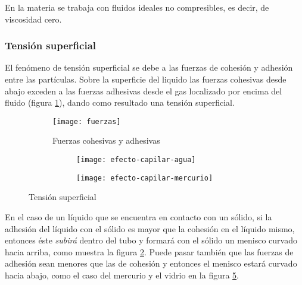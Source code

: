 En la materia \materia se trabaja con fluidos ideales no compresibles, es decir, de viscosidad cero.\\

\subsubsection{Tensión superficial}

El fenómeno de tensión superficial se debe a las fuerzas de cohesión y adhesión entre las partículas. Sobre la superficie del liquido las fuerzas cohesivas desde abajo exceden a las fuerzas adhesivas desde el gas localizado por encima del fluido (figura \ref{fuerzas_cohesivas_adhesivas}), dando como resultado una tensión superficial.

\begin{figure}[h]
	\centering
	\begin{subfigure}[b]{.45\linewidth}
		\centering
		\texttt{[image: fuerzas]}
		\caption{Fuerzas cohesivas y adhesivas}
		\label{fuerzas_cohesivas_adhesivas}
	\end{subfigure}
	\begin{subfigure}[b]{.45\linewidth}
		\centering
		\begin{subfigure}[b]{.45\linewidth}
			\texttt{[image: efecto-capilar-agua]}
			\caption{}
			\label{fig:capilaridad-agua}
		\end{subfigure}
		\begin{subfigure}[b]{.45\linewidth}
			\texttt{[image: efecto-capilar-mercurio]}
			\caption{}
			\label{fig:capilaridad-mercurio}
		\end{subfigure}
	\end{subfigure}
	\caption{Tensión superficial}
\end{figure}

En el caso de un líquido que se encuentra en contacto con un sólido, si la adhesión del líquido con el sólido es mayor que la cohesión en el líquido mismo, entonces éste \emph{subirá} dentro del tubo y formará con el sólido un menisco curvado hacia arriba, como muestra la figura \ref{fig:capilaridad-agua}. Puede pasar también que las fuerzas de adhesión sean menores que las de cohesión y entonces el menisco estará curvado hacia abajo, como el caso del mercurio y el vidrio en la figura \ref{fig:capilaridad-mercurio}.\\ %


